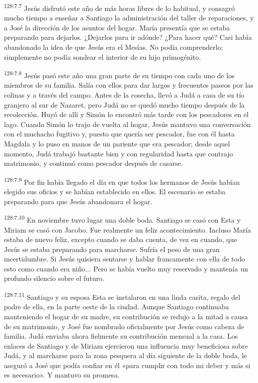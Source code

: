 \par
\textsuperscript{128:7.7} Jesús disfrutó este año de más horas libres de lo habitual, y consagró mucho tiempo a enseñar a Santiago la administración del taller de reparaciones, y a José la dirección de los asuntos del hogar. María presentía que se estaba preparando para dejarlos. ¿Dejarlos para ir adónde? ¿Para hacer qué? Casi había abandonado la idea de que Jesús era el Mesías. No podía comprenderlo; simplemente no podía sondear el interior de su hijo primogénito.

\par
\textsuperscript{128:7.8} Jesús pasó este año una gran parte de su tiempo con cada uno de los miembros de su familia. Salía con ellos para dar largos y frecuentes paseos por las colinas y a través del campo. Antes de la cosecha, llevó a Judá a casa de su tío granjero al sur de Nazaret, pero Judá no se quedó mucho tiempo después de la recolección. Huyó de allí y Simón lo encontró más tarde con los pescadores en el lago. Cuando Simón lo trajo de vuelta al hogar, Jesús mantuvo una conversación con el muchacho fugitivo y, puesto que quería ser pescador, fue con él hasta Magdala y lo puso en manos de un pariente que era pescador; desde aquel momento, Judá trabajó bastante bien y con regularidad hasta que contrajo matrimonio, y continuó como pescador después de casarse.

\par
\textsuperscript{128:7.9} Por fin había llegado el día en que todos los hermanos de Jesús habían elegido sus oficios y se habían establecido en ellos. El escenario se estaba preparando para que Jesús abandonara el hogar.

\par
\textsuperscript{128:7.10} En noviembre tuvo lugar una doble boda. Santiago se casó con Esta y Miriam se casó con Jacobo. Fue realmente un feliz acontecimiento. Incluso María estaba de nuevo feliz, excepto cuando se daba cuenta, de vez en cuando, que Jesús se estaba preparando para marcharse. Sufría el peso de una gran incertidumbre. Si Jesús quisiera sentarse y hablar francamente con ella de todo esto como cuando era niño... Pero se había vuelto muy reservado y mantenía un profundo silencio sobre el futuro.

\par
\textsuperscript{128:7.11} Santiago y su esposa Esta se instalaron en una linda casita, regalo del padre de ella, en la parte oeste de la ciudad. Aunque Santiago continuaba manteniendo el hogar de su madre, su contribución se redujo a la mitad a causa de su matrimonio, y José fue nombrado oficialmente por Jesús como cabeza de familia. Judá enviaba ahora fielmente su contribución mensual a la casa. Los enlaces de Santiago y de Miriam ejercieron una influencia muy beneficiosa sobre Judá, y al marcharse para la zona pesquera al día siguiente de la doble boda, le aseguró a José que podía confiar en él «para cumplir con todo mi deber y más si es necesario». Y mantuvo su promesa.

